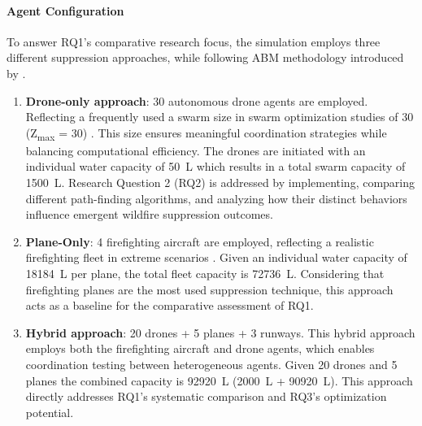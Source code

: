 \documentclass[11pt, a4paper]{article}
\begin{document}
\paragraph{Agent Configuration} To answer RQ1's comparative research focus, the simulation employs three different suppression approaches, while following ABM methodology introduced by \citet*{wilensky2015introduction}.
\begin{enumerate}
  \item \textbf{Drone-only approach}: 30 autonomous drone agents are employed. Reflecting a frequently used a swarm size in swarm optimization studies of 30 (Z\textsubscript{max} = 30) \citep{swarm1_kozlov2022information,swarm2_optimization_drone}. This size ensures meaningful coordination strategies while balancing computational efficiency. The drones are initiated with an individual water capacity of \SI{50}{\liter} which results in a total swarm capacity of \SI{1500}{\liter}. Research Question 2 (RQ2) is addressed by implementing, comparing different path-finding algorithms, and analyzing how their distinct behaviors influence emergent wildfire suppression outcomes.
  \item \textbf{Plane-Only}: 4 firefighting aircraft are employed, reflecting a realistic firefighting fleet in extreme scenarios \citep{sherryAerialFireFighting2025}. Given an individual water capacity of \SI{18184}{\liter} per plane, the total fleet capacity is \SI{72736}{\liter}. Considering that firefighting planes are the most used suppression technique, this approach acts as a baseline for the comparative assessment of RQ1.
  \item \textbf{Hybrid approach}: 20 drones + 5 planes + 3 runways. This hybrid approach employs both the firefighting aircraft and drone agents, which enables coordination testing between heterogeneous agents. Given 20 drones and 5 planes the combined capacity is \SI{92920}{\liter} (\SI{2000}{\liter} + \SI{90920}{\liter}). This approach directly addresses RQ1's systematic comparison and RQ3's optimization potential. 
\end{enumerate}
\end{document}
